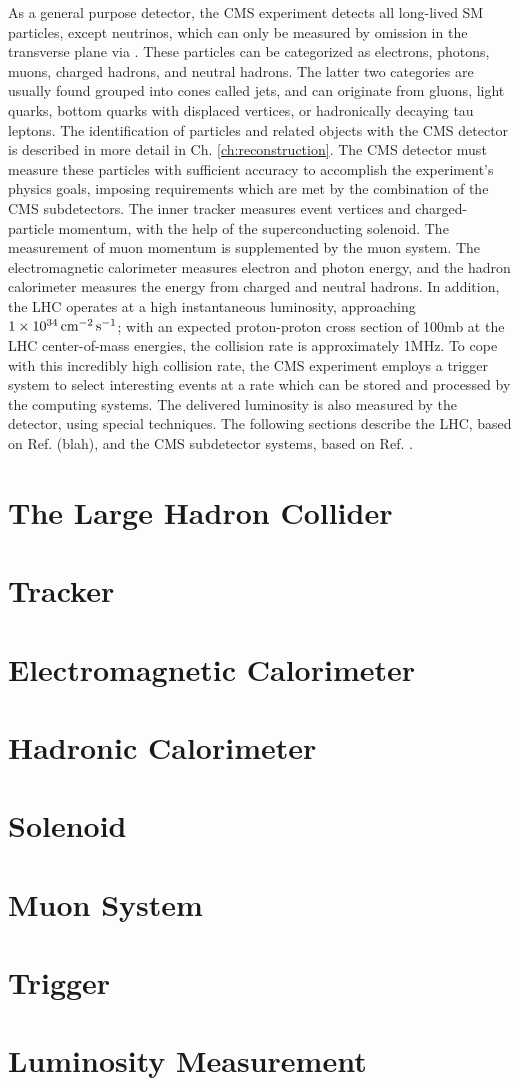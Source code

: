 As a general purpose detector, the CMS experiment detects all long-lived SM particles, except neutrinos, which can only be measured by omission in the transverse plane via \met. These particles can be categorized as electrons, photons, muons, charged hadrons, and neutral hadrons. The latter two categories are usually found grouped into cones called jets, and can originate from gluons, light quarks, bottom quarks with displaced vertices, or hadronically decaying tau leptons. The identification of particles and related objects with the CMS detector is described in more detail in Ch. \ref{ch:reconstruction}. The CMS detector must measure these particles with sufficient accuracy to accomplish the experiment's physics goals, imposing requirements which are met by the combination of the CMS subdetectors. The inner tracker measures event vertices and charged-particle momentum, with the help of the superconducting solenoid. The measurement of muon momentum is supplemented by the muon system. The electromagnetic calorimeter measures electron and photon energy, and the hadron calorimeter measures the energy from charged and neutral hadrons. In addition, the LHC operates at a high instantaneous luminosity, approaching $1\times10^{34}\,\text{cm}^\text{$-$2}\,\text{s}^\text{$-$1}$; with an expected proton-proton cross section of 100\unit{mb} at the LHC center-of-mass energies, the collision rate is approximately 1\unit{MHz}. To cope with this incredibly high collision rate, the CMS experiment employs a trigger system to select interesting events at a rate which can be stored and processed by the computing systems. The delivered luminosity is also measured by the detector, using special techniques. The following sections describe the LHC, based on Ref. (blah), and the CMS subdetector systems, based on Ref. \cite{CMSJINST}.

\section{The Large Hadron Collider}

\section{Tracker}

\section{Electromagnetic Calorimeter}

\section{Hadronic Calorimeter}

\section{Solenoid}

\section{Muon System}

\section{Trigger}

\section{Luminosity Measurement}